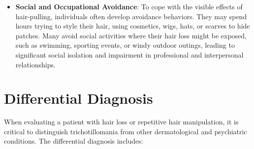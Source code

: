 \begin{itemize}
    \item \textbf{Social and Occupational Avoidance}: To cope with the visible effects of hair-pulling, individuals often develop avoidance behaviors. They may spend hours trying to style their hair, using cosmetics, wigs, hats, or scarves to hide patches. Many avoid social activities where their hair loss might be exposed, such as swimming, sporting events, or windy outdoor outings, leading to significant social isolation and impairment in professional and interpersonal relationships.
\end{itemize}

\section*{Differential Diagnosis}
When evaluating a patient with hair loss or repetitive hair manipulation, it is critical to distinguish trichotillomania from other dermatological and psychiatric conditions. The differential diagnosis includes:

